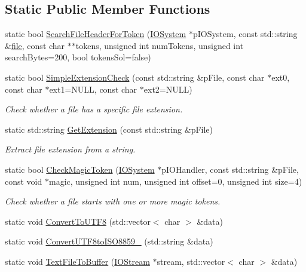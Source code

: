 \subsection*{Static Public Member Functions}
\begin{DoxyCompactItemize}
\item 
static bool \hyperlink{class_assimp_1_1_base_importer_a0f51adee4d99f4bef36f1db178009f51}{Search\+File\+Header\+For\+Token} (\hyperlink{class_assimp_1_1_i_o_system}{I\+O\+System} $\ast$p\+I\+O\+System, const std\+::string \&\hyperlink{structfile}{file}, const char $\ast$$\ast$tokens, unsigned int num\+Tokens, unsigned int search\+Bytes=200, bool tokens\+Sol=false)
\item 
static bool \hyperlink{class_assimp_1_1_base_importer_a459774d87bff2cc54afbd768de98d438}{Simple\+Extension\+Check} (const std\+::string \&p\+File, const char $\ast$ext0, const char $\ast$ext1=N\+U\+L\+L, const char $\ast$ext2=N\+U\+L\+L)
\begin{DoxyCompactList}\small\item\em Check whether a file has a specific file extension. \end{DoxyCompactList}\item 
static std\+::string \hyperlink{class_assimp_1_1_base_importer_a3954284d75f9fe30f5ff1758ecd2faeb}{Get\+Extension} (const std\+::string \&p\+File)
\begin{DoxyCompactList}\small\item\em Extract file extension from a string. \end{DoxyCompactList}\item 
static bool \hyperlink{class_assimp_1_1_base_importer_a32623af462fcf73fd3c665ca4d866d0f}{Check\+Magic\+Token} (\hyperlink{class_assimp_1_1_i_o_system}{I\+O\+System} $\ast$p\+I\+O\+Handler, const std\+::string \&p\+File, const void $\ast$magic, unsigned int num, unsigned int offset=0, unsigned int size=4)
\begin{DoxyCompactList}\small\item\em Check whether a file starts with one or more magic tokens. \end{DoxyCompactList}\item 
static void \hyperlink{class_assimp_1_1_base_importer_a3cd8c81533de987dd7acea6874ad918c}{Convert\+To\+U\+T\+F8} (std\+::vector$<$ char $>$ \&data)
\item 
static void \hyperlink{class_assimp_1_1_base_importer_ad9a7c9788930c44aa40c7448d61a862d}{Convert\+U\+T\+F8to\+I\+S\+O8859\+\_} (std\+::string \&data)
\item 
static void \hyperlink{class_assimp_1_1_base_importer_a8978de932cfe613f71283c1c5bff2974}{Text\+File\+To\+Buffer} (\hyperlink{class_assimp_1_1_i_o_stream}{I\+O\+Stream} $\ast$stream, std\+::vector$<$ char $>$ \&data)
\end{DoxyCompactItemize}

